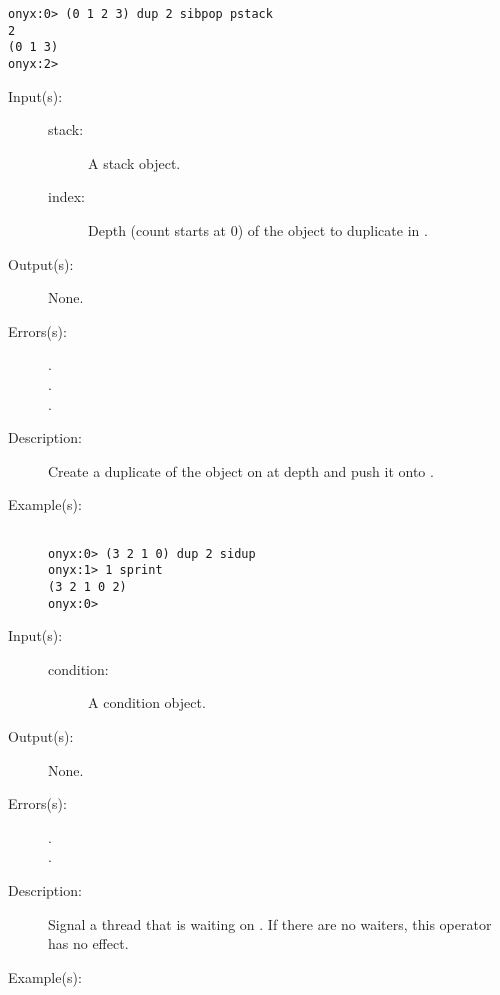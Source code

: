 \begin{description}
\begin{description}
\begin{verbatim}
onyx:0> (0 1 2 3) dup 2 sibpop pstack
2
(0 1 3)
onyx:2>
		\end{verbatim}
	\end{description}
\label{systemdict:sidup}
\item[{\onyxop{stack index}{sidup}{--}}: ]
	\begin{description}\item[]
	\item[Input(s): ]
		\begin{description}\item[]
		\item[stack: ]
			A stack object.
		\item[index: ]
			Depth (count starts at 0) of the object to duplicate in
			.
		\end{description}
	\item[Output(s): ] None.
	\item[Errors(s): ]
		\begin{description}\item[]
		\item[.]
		\item[.]
		\item[.]
		\end{description}
	\item[Description: ]
		Create a duplicate of the object on  at depth
		 and push it onto .
	\item[Example(s): ]\begin{verbatim}

onyx:0> (3 2 1 0) dup 2 sidup
onyx:1> 1 sprint
(3 2 1 0 2)
onyx:0>
		\end{verbatim}
	\end{description}
\label{systemdict:signal}
\item[{\onyxop{condition}{signal}{--}}: ]
	\begin{description}\item[]
	\item[Input(s): ]
		\begin{description}\item[]
		\item[condition: ]
			A condition object.
		\end{description}
	\item[Output(s): ] None.
	\item[Errors(s): ]
		\begin{description}\item[]
		\item[.]
		\item[.]
		\end{description}
	\item[Description: ]
		Signal a thread that is waiting on .  If there
		are no waiters, this operator has no effect.
	\item[Example(s): ]\begin{verbatim}


\end{verbatim}
\end{description}
\end{description}
